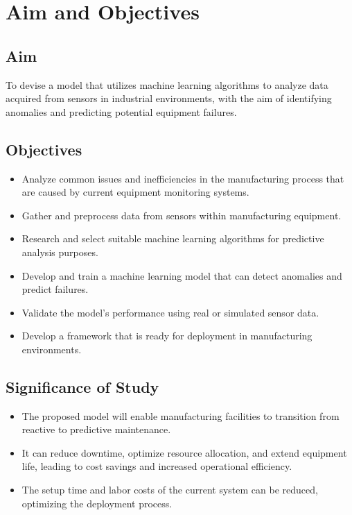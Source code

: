 \chapter{Aim and Objectives}
\label{chap:aim}
\setlength{\parskip}{1em}

\section{Aim}
To devise a model that utilizes machine learning algorithms to analyze data acquired from sensors in industrial environments, with the aim of identifying anomalies and predicting potential equipment failures.


\section{Objectives}

\begin{itemize}
    \item Analyze common issues and inefficiencies in the manufacturing process that are caused by current equipment monitoring systems.
    \item Gather and preprocess data from sensors within manufacturing equipment.
    \item Research and select suitable machine learning algorithms for predictive analysis purposes.
    \item Develop and train a machine learning model that can detect anomalies and predict failures.
    \item Validate the model's performance using real or simulated sensor data.
    \item Develop a framework that is ready for deployment in manufacturing environments.
\end{itemize}

\section{Significance of Study}
\begin{itemize}
    \item The proposed model will enable manufacturing facilities to transition from
reactive to predictive maintenance.
    \item It can reduce downtime, optimize resource allocation, and extend equipment
life, leading to cost savings and increased operational efficiency.
    \item The setup time and labor costs of the current system can be reduced, optimizing
the deployment process.
\end{itemize}